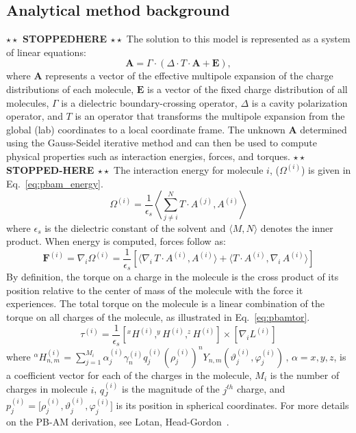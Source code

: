 \documentclass[12pt,titlepage]{article}
\newcommand{\todo}[1]{\textbf{$\star \star$ {#1} $\star \star$}}
\begin{document}
\subsection{Analytical method background}
\todo{STOPPEDHERE}
The solution to this model is represented as a system of linear equations:
\begin{equation} \label{eq:pbam_solve}
\mathbf{A} = \Gamma \cdot (\Delta \cdot T \cdot \mathbf{A} + \mathbf{E}),
\end{equation}
where \(\mathbf{A}\) represents a vector of the effective multipole expansion of the charge distributions of each molecule, \(\mathbf{E}\) is a vector of the fixed charge distribution of all molecules, \(\Gamma\) is a dielectric boundary-crossing operator, \(\Delta\) is a cavity polarization operator, and \(T\) is an operator that transforms the multipole expansion from the global (lab) coordinates to a local coordinate frame. 
The unknown \(\mathbf{A}\) determined using the Gauss-Seidel iterative method and can then be used to compute physical properties such as interaction energies, forces, and torques. \todo{STOPPED-HERE}
%
%
The interaction energy for molecule \(i\), ($\Omega^{(i)}$) is given in Eq.~\ref{eq:pbam_energy}.
%
\begin{equation}\label{eq:pbam_energy}
\Omega^{(i)}=\frac{1}{\epsilon_s} \left \langle \sum_{j \ne i}^N  T \cdot A^{(j) } ,  A^{(i) } \right \rangle 
\end{equation}
%
where $\epsilon_s$ is the dielectric constant of the solvent and $\langle  M, N \rangle$ denotes the inner product. When energy is computed, forces follow as:
%
\begin{equation}\label{eq:pbam_force}
\textbf{F}^{(i)} = \nabla_i \Omega^{(i)}=\frac{1}{\epsilon_s} [ \langle \nabla_i \,T \cdot A^{(i) } ,  A^{(i) } \rangle +  \langle T \cdot A^{(i) } ,   \nabla_i \, A^{(i) } \rangle ]
\end{equation}
%
By definition, the torque on a charge in the molecule is the cross product of its position relative to the center of mass of the molecule with the force it experiences. The total torque on the molecule is a linear combination of the torque on all charges of the molecule, as illustrated in Eq.~\ref{eq:pbamtor}.
%
\begin{equation}\label{eq:pbamtor}
\tau^{(i)} =  \frac{1}{\epsilon_s}\left [  ^xH^{(i)}, ^yH^{(i)}, ^zH^{(i)} \right] \times   \left [  \nabla_i L^{(i)} \right ]
\end{equation} 
%
where $^\alpha H_{n,m}^{(i)}  = \sum_{j=1}^{M_i} \alpha_{j}^{(i)} \gamma_n^{(i)} q_j^{(i)} (\rho_j^{(i)})^n Y_{n,m} (\vartheta_j^{(i)}, \varphi_j^{(i)}) \, , \, \alpha = x , y, z$, is a coefficient vector for each of the charges in the molecule, $M_i$ is the number of charges in molecule $i$, $q_J^{(i)}$ is the magnitude of the $j^{th}$ charge, and $p_j^{(i)}=\Big[\rho_j^{(i)},\vartheta_j^{(i)},\varphi_j^{(i)}\Big]$ is its position in spherical coordinates. For more details on the PB-AM derivation, see Lotan, Head-Gordon~\cite{Lotan2006}.
\end{document}
